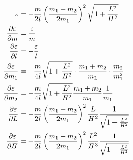 	\begin{align}
	\label{eq:epsilon}
	\varepsilon &= -\frac{m}{2 l} \left( \frac{m_1 + m_2}{2 m_1}\right) ^2 \sqrt{1+\frac{L^2}{H^2}}\\
	\pdv{\varepsilon}{m} &= \frac{\varepsilon}{m}\\
	\pdv{\varepsilon}{l} &= -\frac{\varepsilon}{l}\\
	\pdv{\varepsilon}{m_1} &= +\frac{m}{4 l} \sqrt{1+\frac{L^2}{H^2}} \cdot \frac{m_1 + m_2}{m_1} \cdot \frac{m_2}{m_1^2}\\
	\pdv{\varepsilon}{m_2} &= -\frac{m}{4 l} \sqrt{1+\frac{L^2}{H^2}} \frac{m_1 + m_2}{m_1} \frac{1}{m_1}\\
	\pdv{\varepsilon}{L} &= -\frac{m}{2 l} \left( \frac{m_1 + m_2}{2 m_1}\right) ^2 \frac{L}{H^2}\frac{1}{\sqrt{1+\frac{L^2}{H^2}}}\\
	\pdv{\varepsilon}{H} &= +\frac{m}{2 l} \left( \frac{m_1 + m_2}{2 m_1}\right) ^2 \frac{L^2}{H^3}\frac{1}{\sqrt{1+\frac{L^2}{H^2}}}
	\label{eq:epsilonEnd}
	\end{align}
	